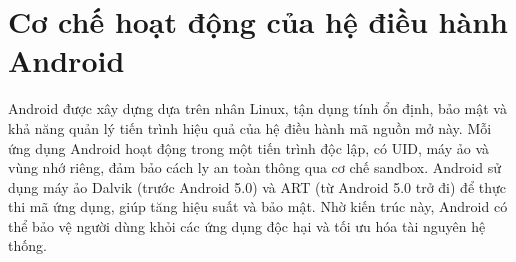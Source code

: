 \section{Cơ chế hoạt động của hệ điều hành Android}

    \hspace*{0.8cm}Android được xây dựng dựa trên nhân Linux, tận dụng tính ổn định, bảo mật và khả năng quản lý tiến trình hiệu quả của hệ điều hành mã nguồn mở này. Mỗi ứng dụng Android hoạt động trong một tiến trình độc lập, có UID, máy ảo và vùng nhớ riêng, đảm bảo cách ly an toàn thông qua cơ chế sandbox. Android sử dụng máy ảo Dalvik (trước Android 5.0) và ART (từ Android 5.0 trở đi) để thực thi mã ứng dụng, giúp tăng hiệu suất và bảo mật. Nhờ kiến trúc này, Android có thể bảo vệ người dùng khỏi các ứng dụng độc hại và tối ưu hóa tài nguyên hệ thống.

